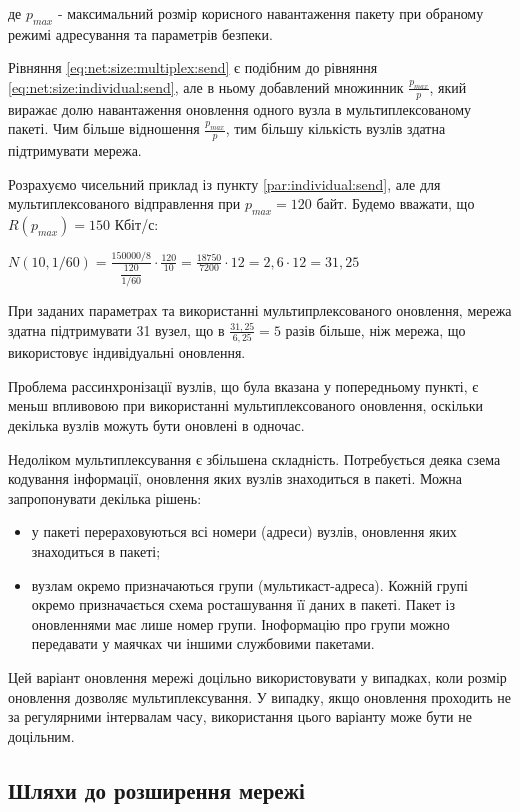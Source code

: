 \documentclass[a4paper,ukrainian,utf8,nocolumnsxix,floatsection,equationsection]{eskdtext}
\begin{document}
де $p_{max}$ - максимальний розмір корисного навантаження пакету при обраному режимі адресування та параметрів безпеки.

Рівняння \ref{eq:net:size:multiplex:send} є подібним до рівняння \ref{eq:net:size:individual:send}, але в ньому добавлений множинник $\frac{p_{max}}{p}$, який виражає долю навантаження оновлення одного вузла в мультиплексованому пакеті. Чим більше відношення $\frac{p_{max}}{p}$, тим більшу кількість вузлів здатна підтримувати мережа.

Розрахуємо чисельний приклад із пункту \ref{par:individual:send}, але для мультиплексованого відправлення при $p_{max} = 120$ байт. Будемо вважати, що $R(p_{max}) = 150$ Кбіт/с:

$N(10, 1/60) = \frac{150000 / 8}{\dfrac{120}{1/60}} \cdot \frac{120}{10} = 
		\frac{18750}{7200} \cdot 12 = 2,6 \cdot 12 = 31,25$


При заданих параметрах та використанні мультипрлексованого оновлення, мережа здатна підтримувати 31 вузел, що в $\frac{31,25}{6,25} = 5$ разів більше, ніж мережа, що використовує індивідуальні оновлення. 

Проблема рассинхронізації вузлів, що була вказана у попередньому пункті, є меньш впливовою при використанні мультиплексованого оновлення, оскільки декілька вузлів можуть бути оновлені в одночас.

Недоліком мультиплексування є збільшена складність. Потребується деяка сзема кодування інформації, оновлення яких вузлів знаходиться в пакеті. Можна запропонувати декілька рішень:

\begin{itemize}
	\item у пакеті перераховуються всі номери (адреси) вузлів, оновлення яких знаходиться в пакеті;
	\item вузлам окремо призначаються групи (мультикаст-адреса). Кожній групі окремо призначається схема росташування її даних в пакеті. Пакет із оновленнями має лише номер групи. Іноформацію про групи можно передавати у маячках чи іншими службовими пакетами.
\end{itemize}

Цей варіант оновлення мережі доцільно використовувати у випадках, коли розмір оновлення дозволяє мультиплексування. У випадку, якщо оновлення проходить не за регулярними інтервалам часу, використання цього варіанту може бути не доцільним.

\subsection{Шляхи до розширення мережі}
\end{document}
